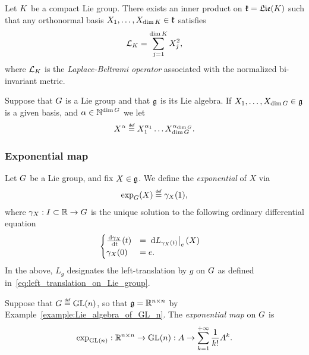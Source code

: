\begin{lemma}
    Let $\CompactGroup$ be a compact Lie group.
    There exists an inner product on $\LieAlgebraCompactGroup = \Lie(\CompactGroup)$ such that
    any orthonormal basis $X_1, \dots, X_{\dim \CompactGroup} \in \LieAlgebraCompactGroup$ satisfies
    \begin{align*}
        \Laplacian [\CompactGroup] = \sum_{j = 1}^{\dim \CompactGroup} X_j^2,
    \end{align*}
    where $\Laplacian [\CompactGroup]$ is
    the \emph{Laplace-Beltrami operator} associated with the normalized bi-invariant metric.
\end{lemma}

Suppose that $\Group$ is a Lie group
and that $\LieAlgebra$ is its Lie algebra.
If $X_1, \dots, X_{\dim \Group} \in \LieAlgebra$ is a given basis,
and $\alpha \in \N^{\dim \Group}$
we let
\begin{align*}
    X^\alpha \defeq X_1^{\alpha_1} \dots X_{\dim \Group}^{\alpha_{\dim \Group}}.
\end{align*}

\subsubsection{Exponential map}

\begin{definition}
    Let $\Group$ be a Lie group,
    and fix $X \in \LieAlgebra$.
    We define the \emph{exponential} of $X$ via
    \begin{align*}
        \exp_\Group(X) \defeq \gamma_X(1),
    \end{align*}
    where $\gamma_X : I \subset \R \to \Group$ is the unique solution to the following ordinary differential equation
    \begin{align*}
        \begin{cases}
            \D* 1 [\gamma_X] t(t) &= \eval{\dd L_{\gamma_X(t)}}{e}(X)\\
            \gamma_X(0) &= e.
        \end{cases}
        \quad
    \end{align*}
    In the above,
    $L_g$ designates the left-translation by $g$ on $\Group$
    as defined in~\eqref{eq:left_translation_on_Lie_group}.
\end{definition}

\begin{example}
    Suppose that $\Group \defeq \GeneralLinear n$,
    so that $\LieAlgebra = \SquareMatrices n$ by Example~\eqref{example:Lie_algebra_of_GL_n}.
    The \emph{exponential map} on $\Group$ is
    \begin{align}
        \exp_{\GeneralLinear n} : \SquareMatrices n \to \GeneralLinear n :
        A \to \sum_{k = 1}^{+\infty} \frac 1 {k!} A^k.
        \label{eq:definition_of_exponential_of_matrices}
    \end{align}
\end{example}

